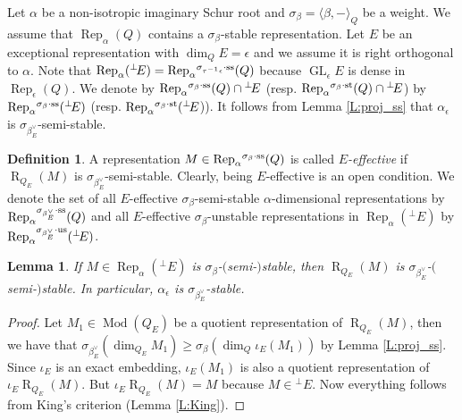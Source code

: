 \documentclass{amsart}
\newtheorem{lemma}[theorem]{Lemma}
\theoremstyle{definition}
\newtheorem{definition}[theorem]{Definition}
\theoremstyle{remark}
\numberwithin{equation}{section}
\begin{document}
Let $\alpha$ be a non-isotropic imaginary Schur root and $\sigma_\beta={\langle{\beta,-}\rangle}_Q$ be a weight. We assume that ${\operatorname{Rep}}_\alpha(Q)$ contains a $\sigma_\beta$-stable representation.
Let $E$ be an exceptional representation with $\dim_Q E=\epsilon$ and we assume it is right orthogonal to $\alpha$. Note that ${\operatorname{Rep}}_\alpha({{^\perp}\!} E)={\operatorname{Rep}}_\alpha{^{\sigma_{{\tau^{-1}\epsilon}}\cdot{\rm {ss}}}}(Q)$ because ${\operatorname{GL}}_\epsilon E$ is dense in ${\operatorname{Rep}}_\epsilon(Q)$.
We denote by ${\operatorname{Rep}}_\alpha{^{\sigma_{{\beta}}\cdot{\rm {ss}}}}(Q)\cap{{^\perp}\!} E$ (resp. ${\operatorname{Rep}}_\alpha{^{\sigma_{{\beta}}\cdot{\rm {st}}}}(Q)\cap{{^\perp}\!} E$) by ${\operatorname{Rep}}_\alpha{^{\sigma_{{\beta}}\cdot{\rm {ss}}}}({{^\perp}\!} E)$ (resp. ${\operatorname{Rep}}_\alpha{^{\sigma_{{\beta}}\cdot{\rm {st}}}}({{^\perp}\!} E$)).
It follows from Lemma \ref{L:proj_ss} that $\alpha_\epsilon$ is $\sigma_{\beta_E^\vee}$-semi-stable.

\begin{definition} A representation $M\in{\operatorname{Rep}}_\alpha{^{\sigma_{{\beta}}\cdot{\rm {ss}}}}(Q)$ is called {\em $E$-effective} if ${\operatorname{R}}_{Q_E}(M)$ is $\sigma_{\beta_E^\vee}$-semi-stable. Clearly, being $E$-effective is an open condition.
We denote the set of all $E$-effective $\sigma_\beta$-semi-stable $\alpha$-dimensional representations by ${\operatorname{Rep}}_\alpha{^{\sigma_{{\beta_E^\vee}}\cdot{\rm {ss}}}}(Q)$ and all $E$-effective $\sigma_\beta$-unstable representations in ${\operatorname{Rep}}_\alpha({{^\perp}\!} E)$ by ${\operatorname{Rep}}_\alpha{^{\sigma_{{\beta_E^\vee}}\cdot{\rm {us}}}}({{^\perp}\!} E)$.
\end{definition}

\begin{lemma} \label{L:pi_E_ss}
If $M\in {\operatorname{Rep}}_\alpha({{^\perp}\!} E)$ is $\sigma_\beta$-$($semi-$)$stable, then ${\operatorname{R}}_{Q_E}(M)$ is $\sigma_{\beta_E^\vee}$-$($semi-$)$stable. In particular, $\alpha_\epsilon$ is $\sigma_{\beta_E^\vee}$-stable.
\end{lemma}

\begin{proof}
Let $M_1\in{\operatorname{Mod}}(Q_E)$ be a quotient representation of ${\operatorname{R}}_{Q_E}(M)$, then we have that $\sigma_{\beta_E^\vee}(\dim_{Q_E}M_1)\geqslant\sigma_\beta(\dim_Q\iota_E(M_1))$ by Lemma \ref{L:proj_ss}. Since $\iota_E$ is an exact embedding, $\iota_E(M_1)$ is also a quotient representation of  $\iota_E{\operatorname{R}}_{Q_E}(M)$. But $\iota_E{\operatorname{R}}_{Q_E}(M)=M$ because $M\in{{^\perp}\!} E$. Now everything follows from King's criterion (Lemma \ref{L:King}).
\end{proof}
\end{document}
